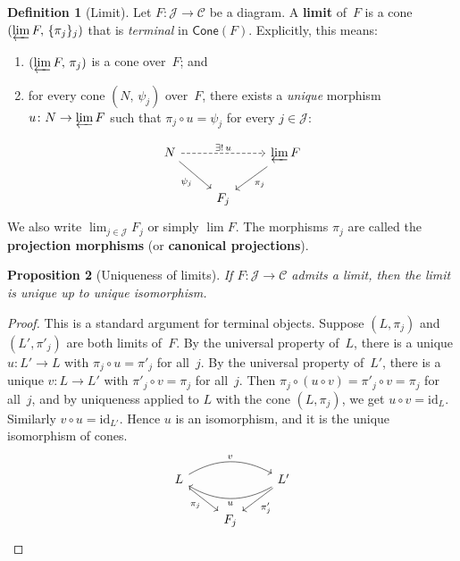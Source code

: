 \documentclass[a4paper,12pt]{book}
\newcommand{\id}{\mathrm{id}}
\theoremstyle{definition}
\newtheorem{definition}{Definition}[section]
\theoremstyle{plain}
\newtheorem{proposition}[definition]{Proposition}
\theoremstyle{remark}
\begin{document}
\begin{definition}[Limit]\label{def:limit}
Let $F\colon\mathcal{J}\to\mathcal{C}$ be a diagram.
A \textbf{limit} of~$F$ is a cone $(\varprojlim F,\,\{\pi_j\}_{j})$
that is \emph{terminal} in $\mathsf{Cone}(F)$.
Explicitly, this means:
\begin{enumerate}[label=(\alph*)]
\item $(\varprojlim F,\,\pi_j)$ is a cone over~$F$; and
\item for every cone $(N,\,\psi_j)$ over~$F$, there exists a
      \emph{unique} morphism $u\colon N\to\varprojlim F$
      such that $\pi_j\circ u = \psi_j$ for every $j\in\mathcal{J}$:
\end{enumerate}
\[
\begin{tikzcd}
N \arrow[dr, "\psi_j"'] \arrow[rr, dashed, "\exists!\, u"] & & \varprojlim F \arrow[dl, "\pi_j"] \\
& F_j &
\end{tikzcd}
\]
We also write $\lim_{j\in\mathcal{J}} F_j$ or simply $\lim F$.
The morphisms $\pi_j$ are called the \textbf{projection morphisms}
(or \textbf{canonical projections}).
\end{definition}

\begin{proposition}[Uniqueness of limits]\label{prop:limit-unique}
If $F\colon\mathcal{J}\to\mathcal{C}$ admits a limit, then the limit
is unique up to unique isomorphism.
\end{proposition}

\begin{proof}
This is a standard argument for terminal objects.
Suppose $(L,\pi_j)$ and $(L',\pi'_j)$ are both limits of~$F$.
By the universal property of~$L$, there is a unique
$u\colon L'\to L$ with $\pi_j\circ u = \pi'_j$ for all~$j$.
By the universal property of~$L'$, there is a unique
$v\colon L\to L'$ with $\pi'_j\circ v = \pi_j$ for all~$j$.
Then $\pi_j\circ(u\circ v) = \pi'_j\circ v = \pi_j$
for all~$j$, and by uniqueness applied to $L$ with the cone $(L,\pi_j)$,
we get $u\circ v = \id_L$.  Similarly $v\circ u = \id_{L'}$.
Hence $u$ is an isomorphism, and it is the unique isomorphism of cones.
\[
\begin{tikzcd}
L \arrow[rr, bend left, "v"] & & L' \arrow[ll, bend left, "u"] \\
& F_j \arrow[ul, leftarrow, "\pi_j"] \arrow[ur, leftarrow, "\pi'_j"'] &
\end{tikzcd}
\]
\end{proof}
\end{document}
